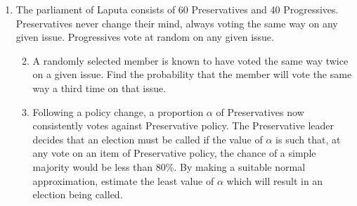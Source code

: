 \documentclass[a4, 11pt]{report}
\newlength{\qspace}
\newcounter{qnumber}
\newenvironment{question}%
 {\vspace{\qspace}
  \begin{enumerate}[\bfseries 1\quad][10]%
    \setcounter{enumi}{\value{qnumber}}%
    \item%
 }
{
  \end{enumerate}
  \filbreak
  \stepcounter{qnumber}
 }
\newenvironment{questionparts}[1][1]%
 {
  \begin{enumerate}[\bfseries (i)]%
    \setcounter{enumii}{#1}
    \addtocounter{enumii}{-1}
    \setlength{\itemsep}{5mm}
    \setlength{\parskip}{8pt}
 }
 {
  \end{enumerate}
 }
\begin{document}
\begin{question}
	The parliament of Laputa consists of 60 Preservatives and 40 Progressives.
	Preservatives never change their mind, always voting the same way
	on any given issue. Progressives vote at random on any given issue. 

	\begin{questionparts}
	\item A randomly selected member is known to have voted the same way twice
	on a given issue. Find the probability that the member will vote the
	same way a third time on that issue. 
	\item Following a policy change, a proportion $\alpha$ of Preservatives
	now consistently votes against Preservative policy. The Preservative
	leader decides that an election must be called if the value of $\alpha$
	is such that, at any vote on an item of Preservative policy, the chance
	of a simple majority would be less than 80\%. By making a suitable
	normal approximation, estimate the least value of $\alpha$ which
	will result in an election being called.
\end{questionparts}
	\end{question}
\end{document}
